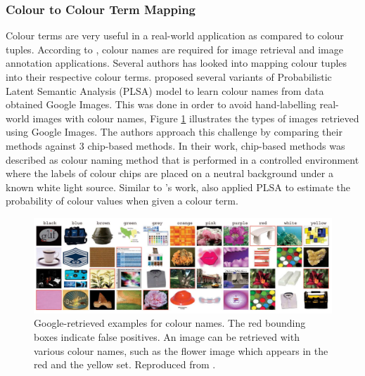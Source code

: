\subsubsection{Colour to Colour Term Mapping}

Colour terms are very useful in a real-world application as compared to colour
tuples. According to \cite{van2009learning}, colour names are required for image
retrieval and image annotation applications. Several authors has looked into
mapping colour tuples into their respective colour terms.
 proposed several variants of Probabilistic Latent
Semantic Analysis (PLSA) model to learn colour names from data obtained Google
Images. This was done in order to avoid hand-labelling real-world images with
colour names, Figure \ref{fig:van20091} illustrates the types of images
retrieved using Google Images. The authors approach this challenge by comparing
their methods against 3 chip-based methods. In their work, chip-based methods
was described as colour naming method that is performed in a controlled
environment where the labels of colour chips are placed on a neutral background
under a known white light source. Similar to 's work,
 also applied PLSA to estimate the probability of colour
values when given a colour term.

\begin{figure}[hbt!]
 \centering
 \includegraphics[width=1\textwidth]{image/lit/van20091.PNG}
 \caption[Google-retrieved examples for colour names. The red bounding boxes
 indicate false positives. An image can be retrieved with various colour names,
 such as the flower image which appears in the red and the yellow
 set]{Google-retrieved examples for colour names. The red bounding boxes
 indicate false positives. An image can be retrieved with various colour names,
 such as the flower image which appears in the red and the yellow set.
 Reproduced from .}
 \label{fig:van20091}
\end{figure}

